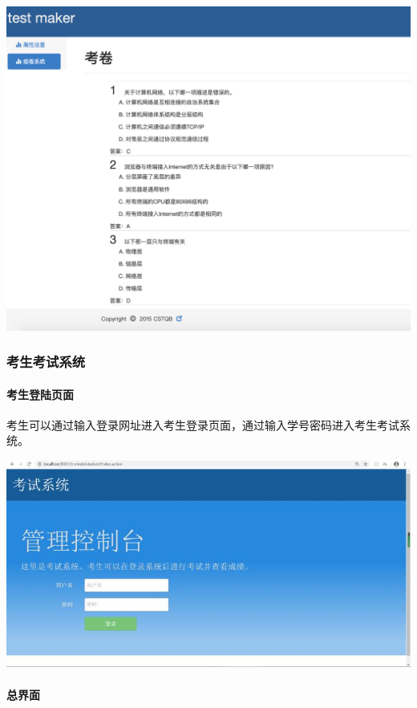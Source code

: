 \documentclass[hyperref, a4paper]{ctexart}
\let\oldparagraph\paragraph
\renewcommand{\paragraph}[1]{\oldparagraph{#1}\mbox{}}
\begin{document}
\includegraphics{pics/paper_preview.png}

\hypertarget{ux8003ux751fux8003ux8bd5ux7cfbux7edf}{%
\subsubsection{考生考试系统}\label{ux8003ux751fux8003ux8bd5ux7cfbux7edf}}

\hypertarget{ux8003ux751fux767bux9646ux9875ux9762}{%
\paragraph{考生登陆页面}\label{ux8003ux751fux767bux9646ux9875ux9762}}

考生可以通过输入登录网址进入考生登录页面，通过输入学号密码进入考生考试系统。

\includegraphics{pics/student_login.jpeg}

\hypertarget{ux603bux754cux9762}{%
\paragraph{总界面}\label{ux603bux754cux9762}}
\end{document}
